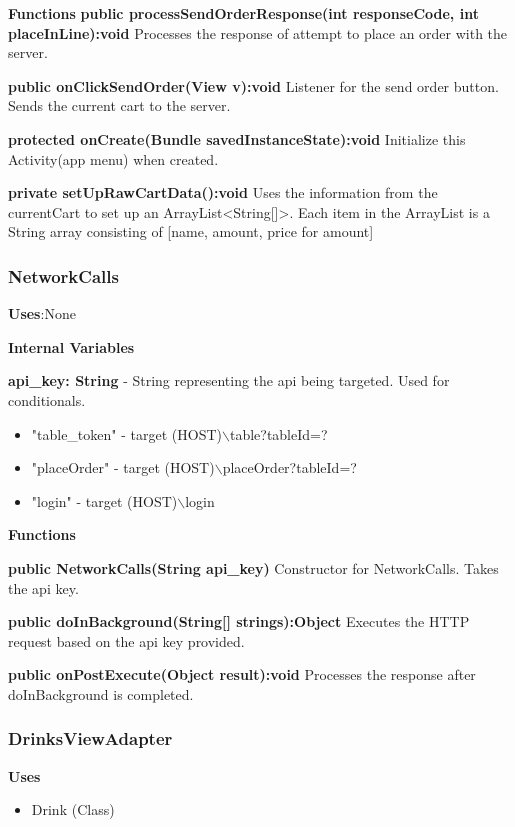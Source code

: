 \documentclass [10pt]{article}
\begin{document}
\textbf{Functions}
\textbf{public processSendOrderResponse(int responseCode, int placeInLine):void}
Processes the response of attempt to place an order with the server.

\textbf{public onClickSendOrder(View v):void}
Listener for the send order button. Sends the current cart to the server.

\textbf{protected onCreate(Bundle savedInstanceState):void}
Initialize this Activity(app menu) when created.

\textbf{private setUpRawCartData():void}
Uses the information from the currentCart to set up an ArrayList<String[]>. Each item in the ArrayList is a String array consisting of [name, amount, price for amount]

\subsubsection{NetworkCalls}

\textbf{Uses}:None

\textbf{Internal Variables}

\textbf{api\_key: String} - String representing the api being targeted. Used for conditionals.

\begin{itemize}
	\item "table\_token" - target (HOST)$\backslash$table?tableId=?
	\item "placeOrder" - target (HOST)$\backslash$placeOrder?tableId=?
	\item "login" - target (HOST)$\backslash$login
\end{itemize}

\textbf{Functions}

\textbf{public NetworkCalls(String api\_key)}
Constructor for NetworkCalls. Takes the api key.

\textbf{public doInBackground(String[] strings):Object}
Executes the HTTP request based on the api key provided.

\textbf{public onPostExecute(Object result):void}
Processes the response after doInBackground is completed.

\subsubsection{DrinksViewAdapter}

\textbf{Uses}

\begin{itemize}
	\item Drink (Class)
\end{itemize}
\end{document}
